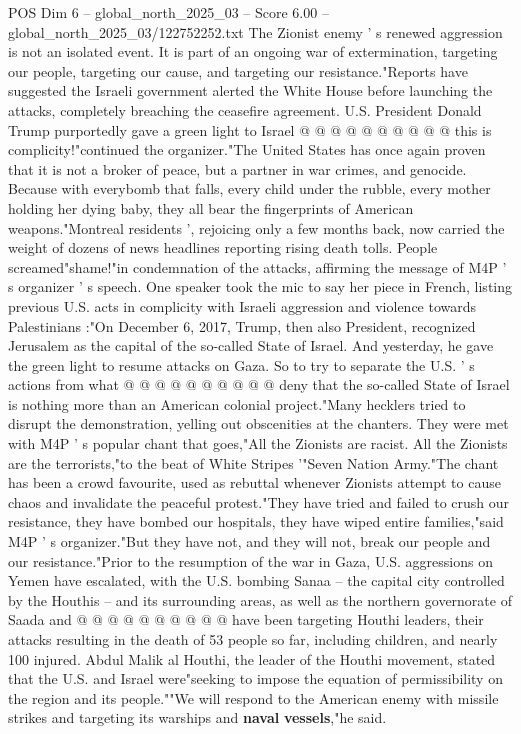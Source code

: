 \begin{textsample}{POS Dim 6 – global\_north\_2025\_03 – Score 6.00 – global\_north\_2025\_03/122752252.txt}
The Zionist enemy ' s renewed aggression is not an isolated event.
It is part of an ongoing war of extermination, targeting our people, targeting our cause, and targeting our resistance."Reports have suggested the Israeli government alerted the White House before launching the attacks, completely breaching the ceasefire agreement.
U.S.
President Donald Trump purportedly gave a green light to Israel @ @ @ @ @ @ @ @ @ @ this is complicity!"continued the organizer."The United States has once again proven that it is not a broker of peace, but a partner in war crimes, and genocide.
Because with everybomb that falls, every child under the rubble, every mother holding her dying baby, they all bear the fingerprints of American weapons."Montreal residents ', rejoicing only a few months back, now carried the weight of dozens of news headlines reporting rising death tolls.
People screamed"shame!"in condemnation of the attacks, affirming the message of M4P ' s organizer ' s speech.
One speaker took the mic to say her piece in French, listing previous U.S. acts in complicity with Israeli aggression and violence towards Palestinians :"On December 6, 2017, Trump, then also President, recognized Jerusalem as the capital of the so-called State of Israel.
And yesterday, he gave the green light to resume attacks on Gaza.
So to try to separate the U.S. ' s actions from what @ @ @ @ @ @ @ @ @ @ deny that the so-called State of Israel is nothing more than an American colonial project."Many hecklers tried to disrupt the demonstration, yelling out obscenities at the chanters.
They were met with M4P ' s popular chant that goes,"All the Zionists are racist.
All the Zionists are the terrorists,"to the beat of White Stripes '"Seven Nation Army."The chant has been a crowd favourite, used as rebuttal whenever Zionists attempt to cause chaos and invalidate the peaceful protest."They have tried and failed to crush our resistance, they have bombed our hospitals, they have wiped entire families,"said M4P ' s organizer."But they have not, and they will not, break our people and our resistance."Prior to the resumption of the war in Gaza, U.S. aggressions on Yemen have escalated, with the U.S. bombing Sanaa -- the capital city controlled by the Houthis -- and its surrounding areas, as well as the northern governorate of Saada and @ @ @ @ @ @ @ @ @ @ have been targeting Houthi leaders, their attacks resulting in the death of 53 people so far, including children, and nearly 100 injured.
Abdul Malik al Houthi, the leader of the Houthi movement, stated that the U.S. and Israel were"seeking to impose the equation of permissibility on the region and its people.""We will respond to the American enemy with missile strikes and targeting its warships and \textbf{naval} \textbf{vessels},"he said.

\end{textsample}
